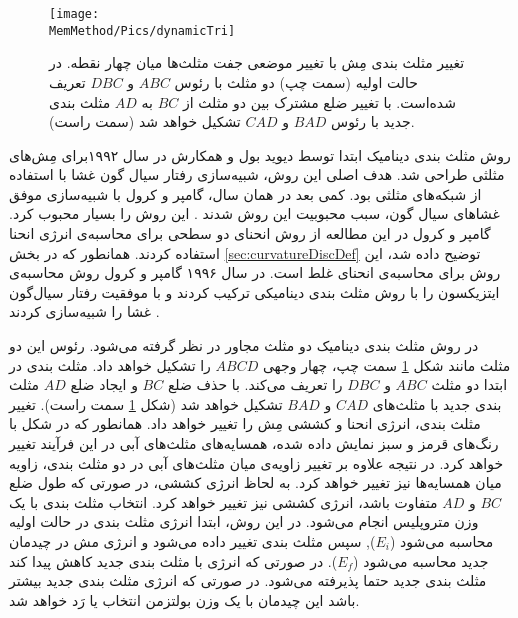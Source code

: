 \begin{figure}[h]
\begin{center}
\texttt{[image: \\MemMethod/Pics/dynamicTri]}
\caption{
تغییر مثلث بندی مِش با تغییر موضعی جفت مثلث‌ها میان چهار نقطه. در حالت اولیه (سمت چپ) دو مثلث با رئوس
$ABC$
و
$DBC$
تعریف شده‌است. با تغییر ضلع مشترک بین دو مثلث از 
$BC$
به
$AD$
مثلث بندی جدید با رئوس
$BAD$
و 
$CAD$
تشکیل خواهد شد (سمت راست).
}
\label{fig:dynamicTri}
\end{center}
\end{figure}



روش  مثلث بندی دینامیک
ابتدا توسط دیوید بول
و همکارش 
\cite{Boal1992PRA}
در سال ۱۹۹۲برای مِش‌های مثلثی طراحی شد. هدف اصلی این روش، شبیه‌سازی رفتار سیال گون غشا با استفاده از شبکه‌های مثلثی بود. کمی‌ بعد در همان سال، گامپر و کرول با  شبیه‌سازی موفق غشاهای سیال گون، سبب محبوبیت این روش شدند 
\cite{Gompper1992Science}.
این روش را بسیار محبوب کرد. گامپر و کرول در این مطالعه از روش انحنای دو سطحی برای محاسبه‌ی انرژی انحنا استفاده کردند. همانطور که در بخش
\ref{sec:curvatureDiscDef}
توضیح داده شد، این روش برای محاسبه‌ی انحنای غلط است. در سال ۱۹۹۶ گامپر و کرول روش محاسبه‌ی ایتزیکسون را با روش مثلث بندی دینامیکی ترکیب کردند و با موفقیت رفتار سیال‌گون غشا را شبیه‌سازی کردند
\cite{gompper1996}.

در روش مثلث بندی دینامیک دو مثلث مجاور در نظر گرفته می‌شود. رئوس این دو مثلث مانند شکل 
\ref{fig:dynamicTri}
سمت چپ، چهار وجهی 
$ABCD$
را تشکیل خواهد داد. مثلث بندی در ابتدا دو مثلث 
$ABC$
و
$DBC$
را تعریف می‌کند. با حذف ضلع
$BC$
و ایجاد ضلع
$AD$
مثلث بندی جدید با مثلث‌های
$CAD$
و
$BAD$
تشکیل خواهد شد (شکل
\ref{fig:dynamicTri}
سمت راست). تغییر مثلث بندی، انرژی انحنا و کششی مِش را تغییر خواهد داد. همانطور که در شکل با رنگ‌های قرمز و سبز نمایش داده شده، همسایه‌های مثلث‌های آبی در این فرآیند تغییر خواهد کرد. در نتیجه علاوه بر تغییر زاویه‌ی میان مثلث‌های آبی در دو مثلث بندی، زاویه میان همسایه‌ها نیز تغییر خواهد کرد. به لحاظ انرژی کششی، در صورتی که طول ضلع 
$BC$
و
$AD$
متفاوت باشد، انرژی کششی نیز تغییر خواهد کرد. انتخاب مثلث بندی با یک وزن متروپلیس
 انجام می‌شود. در این روش، ابتدا انرژی مثلث بندی در حالت اولیه محاسبه می‌شود
($E_i$),
سپس مثلث بندی تغییر داده می‌شود و انرژی مش در چیدمان جدید محاسبه ‌می‌شود
($E_f$).
 در صورتی که انرژی با مثلث بندی جدید کاهش پیدا کند مثلث بندی جدید حتما پذیرفته می‌شود. در صورتی که انرژی مثلث بندی جدید بیشتر باشد این چیدمان با یک وزن بولتزمن
انتخاب یا رَد خواهد شد. 

